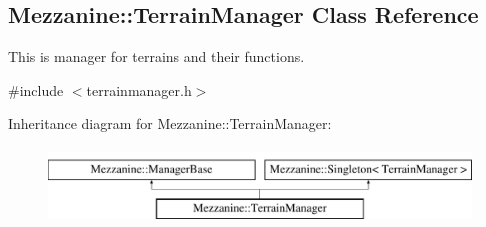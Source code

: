 \hypertarget{classMezzanine_1_1TerrainManager}{
\subsection{Mezzanine::TerrainManager Class Reference}
\label{classMezzanine_1_1TerrainManager}
}


This is manager for terrains and their functions.  




{\ttfamily \#include $<$terrainmanager.h$>$}

Inheritance diagram for Mezzanine::TerrainManager:\begin{figure}[H]
\begin{center}
\leavevmode
\includegraphics[height=2.000000cm]{classMezzanine_1_1TerrainManager}
\end{center}
\end{figure}
